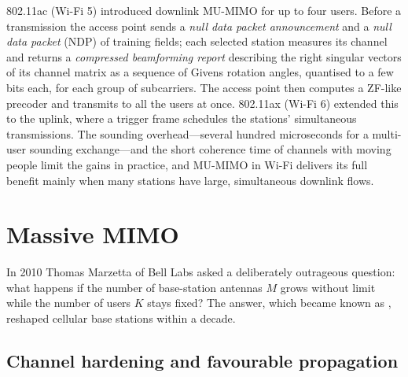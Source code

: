 
\begin{inpractice}[MU-MIMO in Wi-Fi]
802.11ac (Wi-Fi 5) introduced downlink MU-MIMO for up to four users. Before a transmission the
access point sends a \emph{null data packet announcement} and a \emph{null data packet} (NDP) of
training fields; each selected station measures its channel and returns a \emph{compressed
beamforming report} describing the right singular vectors of its channel matrix as a sequence of
Givens rotation angles, quantised to a few bits each, for each group of subcarriers. The access
point then computes a ZF-like precoder and transmits to all the users at once. 802.11ax (Wi-Fi 6)
extended this to the uplink, where a trigger frame schedules the stations' simultaneous
transmissions. The sounding overhead---several hundred microseconds for a multi-user sounding
exchange---and the short coherence time of channels with moving people limit the gains in practice,
and MU-MIMO in Wi-Fi delivers its full benefit mainly when many stations have large, simultaneous
downlink flows.
\end{inpractice}

\section{Massive MIMO}
\label{sec:ch19:massive}

In 2010 Thomas Marzetta of Bell Labs asked a deliberately outrageous question: what happens if the
number of base-station antennas $M$ grows without limit while the number of users $K$ stays fixed?
The answer, which became known as , reshaped cellular base stations within a
decade.

\subsection{Channel hardening and favourable propagation}


